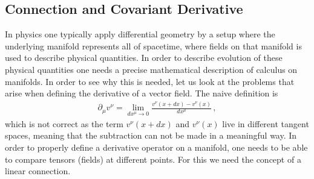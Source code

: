 \subsection*{Connection and Covariant Derivative}
In physics one typically apply differential geometry by a setup where the underlying manifold represents all of spacetime, where fields on that manifold is used to describe physical quantities. In order to describe evolution of these physical quantities one needs a precise mathematical description of calculus on manifolds. In order to see why this is needed, let us look at the problems that arise when defining the derivative of a vector field. The naive definition is
\begin{align}\label{eq:directional derivative vector field}
    \partial_{\mu}v^{\nu}=\lim_{dx^{\mu}\to 0}\frac{v^{\nu}(x+dx)-v^{\nu}(x)}{dx^{\mu}}\,,
\end{align}
which is not correct as the term $v^{\nu}(x+dx)$ and $v^{\nu}(x)$ live in different tangent spaces, meaning that the subtraction can not be made in a meaningful way. %
In order to properly define a derivative operator on a manifold, one needs to be able to compare tensors (fields) at different points. For this we need the concept of a linear connection.

